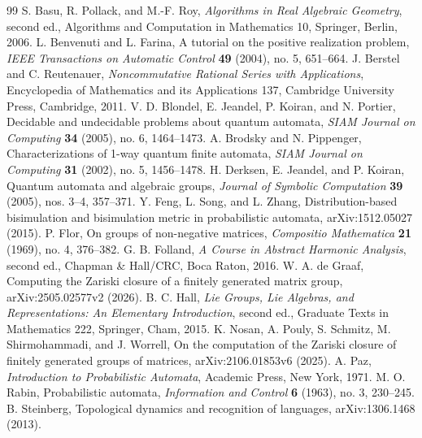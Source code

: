 \begin{thebibliography}{99}
 S. Basu, R. Pollack, and M.-F. Roy, \emph{Algorithms in Real Algebraic Geometry}, second ed., Algorithms and Computation in Mathematics 10, Springer, Berlin, 2006.
 L. Benvenuti and L. Farina, A tutorial on the positive realization problem, \emph{IEEE Transactions on Automatic Control} \textbf{49} (2004), no. 5, 651--664.
 J. Berstel and C. Reutenauer, \emph{Noncommutative Rational Series with Applications}, Encyclopedia of Mathematics and its Applications 137, Cambridge University Press, Cambridge, 2011.
 V. D. Blondel, E. Jeandel, P. Koiran, and N. Portier, Decidable and undecidable problems about quantum automata, \emph{SIAM Journal on Computing} \textbf{34} (2005), no. 6, 1464--1473.
 A. Brodsky and N. Pippenger, Characterizations of 1-way quantum finite automata, \emph{SIAM Journal on Computing} \textbf{31} (2002), no. 5, 1456--1478.
 H. Derksen, E. Jeandel, and P. Koiran, Quantum automata and algebraic groups, \emph{Journal of Symbolic Computation} \textbf{39} (2005), nos. 3--4, 357--371.
 Y. Feng, L. Song, and L. Zhang, Distribution-based bisimulation and bisimulation metric in probabilistic automata, arXiv:1512.05027 (2015).
 P. Flor, On groups of non-negative matrices, \emph{Compositio Mathematica} \textbf{21} (1969), no. 4, 376--382.
 G. B. Folland, \emph{A Course in Abstract Harmonic Analysis}, second ed., Chapman \& Hall/CRC, Boca Raton, 2016.
 W. A. de Graaf, Computing the Zariski closure of a finitely generated matrix group, arXiv:2505.02577v2 (2026).
 B. C. Hall, \emph{Lie Groups, Lie Algebras, and Representations: An Elementary Introduction}, second ed., Graduate Texts in Mathematics 222, Springer, Cham, 2015.
 K. Nosan, A. Pouly, S. Schmitz, M. Shirmohammadi, and J. Worrell, On the computation of the Zariski closure of finitely generated groups of matrices, arXiv:2106.01853v6 (2025).
 A. Paz, \emph{Introduction to Probabilistic Automata}, Academic Press, New York, 1971.
 M. O. Rabin, Probabilistic automata, \emph{Information and Control} \textbf{6} (1963), no. 3, 230--245.
 B. Steinberg, Topological dynamics and recognition of languages, arXiv:1306.1468 (2013).
\end{thebibliography}
